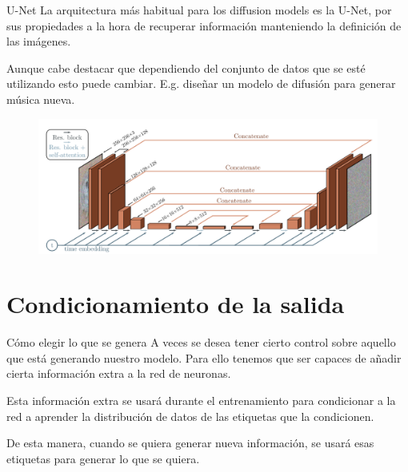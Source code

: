 \begin{frame}{U-Net}
La arquitectura \alert{más habitual} para los diffusion models es la U-Net, por sus propiedades a la hora de recuperar información manteniendo la \alert{definición} de las imágenes.

Aunque cabe destacar que dependiendo del \alert{conjunto de datos} que se esté utilizando esto puede cambiar. E.g. diseñar un modelo de difusión para generar música nueva.

\begin{figure}
    \centering
    \includegraphics[width=\textwidth]{Slides/figures/Diffusion_Models/U-Net.png}
    \caption{\cite{U-Net}}
\end{figure}
\end{frame}

\section{Condicionamiento de la salida}

\begin{frame}{Cómo elegir lo que se genera}
A veces se desea tener cierto \alert{control} sobre aquello que está generando nuestro modelo. Para ello tenemos que ser capaces de añadir cierta \alert{información extra} a la red de neuronas.

Esta información extra se usará durante el \alert{entrenamiento} para condicionar a la red a aprender la \alert{distribución de datos} de las etiquetas que la condicionen.

De esta manera, cuando se quiera generar nueva información, se usará esas \alert{etiquetas} para generar lo que se quiera.
\end{frame}

